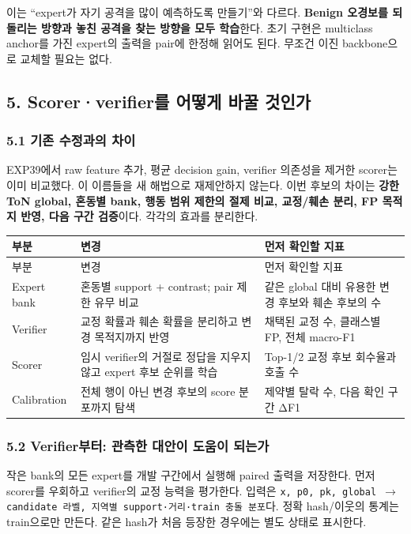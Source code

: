 이는 “expert가 자기 공격을 많이 예측하도록 만들기”와 다르다. \textbf{Benign 오경보를 되돌리는 방향과 놓친 공격을 찾는 방향을 모두 학습}한다. 초기 구현은 multiclass anchor를 가진 expert의 출력을 pair에 한정해 읽어도 된다. 무조건 이진 backbone으로 교체할 필요는 없다.

\subsection{5. Scorer·verifier를 어떻게 바꿀 것인가}
\subsubsection{5.1 기존 수정과의 차이}
EXP39에서 raw feature 추가, 평균 decision gain, verifier 의존성을 제거한 scorer는 이미 비교했다. 이 이름들을 새 해법으로 재제안하지 않는다. 이번 후보의 차이는 \textbf{강한 ToN global, 혼동별 bank, 행동 범위 제한의 절제 비교, 교정/\allowbreak{}훼손 분리, FP 목적지 반영, 다음 구간 검증}이다. 각각의 효과를 분리한다.

\begingroup
\footnotesize
\begin{longtable}{>{\raggedright\arraybackslash}p{}>{\raggedright\arraybackslash}p{}>{\raggedright\arraybackslash}p{}}
\toprule
부분 & 변경 & 먼저 확인할 지표 \\ \midrule
\endfirsthead
부분 & 변경 & 먼저 확인할 지표 \\ \midrule
\endhead
{}Expert bank & 혼동별 support +\allowbreak{} contrast; pair 제한 유무 비교 & 같은 global 대비 유용한 변경 후보와 훼손 후보의 수 \\
{}Verifier & 교정 확률과 훼손 확률을 분리하고 변경 목적지까지 반영 & 채택된 교정 수, 클래스별 FP, 전체 macro-F1 \\
{}Scorer & 임시 verifier의 거절로 정답을 지우지 않고 expert 후보 순위를 학습 & Top-1/\allowbreak{}2 교정 후보 회수율과 호출 수 \\
{}Calibration & 전체 행이 아닌 변경 후보의 score 분포까지 탐색 & 제약별 탈락 수, 다음 확인 구간 ΔF1 \\
\bottomrule
\end{longtable}
\endgroup
\subsubsection{5.2 Verifier부터: 관측한 대안이 도움이 되는가}
작은 bank의 모든 expert를 개발 구간에서 실행해 paired 출력을 저장한다. 먼저 scorer를 우회하고 verifier의 교정 능력을 평가한다. 입력은 \texttt{x,\allowbreak{} p0,\allowbreak{} p\allowbreak{}k,\allowbreak{} globa\allowbreak{}l  \ensuremath{\rightarrow}  cand\allowbreak{}idate 라벨\allowbreak{},\allowbreak{} 지역별 su\allowbreak{}pport·거리\allowbreak{}·train 충\allowbreak{}돌 분포}다. 정확 hash/\allowbreak{}이웃의 통계는 train으로만 만든다. 같은 hash가 처음 등장한 경우에는 별도 상태로 표시한다.

